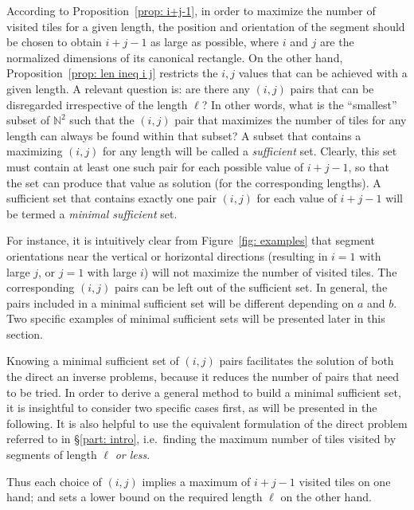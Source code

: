 \documentclass[12pt, a4paper]{article}
\newcommand{\len}{\ell} %
\newcommand{\touched}{visited}
\begin{document}
According to Proposition~\ref{prop: i+j-1}, in order to maximize the number of \touched{} tiles for a given length, the position and orientation of the segment should be chosen to obtain $i+j-1$ as large as possible, where $i$ and $j$ are the normalized dimensions of its canonical rectangle. On the other hand, Proposition~\ref{prop: len ineq i j} restricts the $i, j$ values that can be achieved with a given length. A relevant question is: are there any $(i,j)$ pairs that can be disregarded irrespective of the length $\len$? In other words, what is the ``smallest'' subset of $\mathbb N^2$ such that the $(i,j)$ pair that maximizes the number of tiles for any length can always be found within that subset? A subset that contains a maximizing $(i,j)$ for any length will be called a \emph{sufficient} set. Clearly, this set must contain at least one such pair for each possible value of $i+j-1$, so that the set can produce that value as solution (for the corresponding lengths). A sufficient set that contains exactly one pair $(i,j)$ for each value of $i+j-1$ will be termed a \emph{minimal sufficient} set.

For instance, it is intuitively clear from Figure~\ref{fig: examples} that segment orientations near the vertical or horizontal directions (resulting in $i=1$ with large $j$, or $j=1$ with large $i$) will not maximize the number of \touched{} tiles.
The corresponding $(i,j)$ pairs can be left out of the sufficient set. In general, the pairs included in a minimal sufficient set will be different depending on $a$ and $b$. Two specific examples of minimal sufficient sets will be presented later in this section.

Knowing a minimal sufficient set of $(i,j)$ pairs facilitates the solution of both the direct an inverse problems, because it reduces the number of pairs that need to be tried. In order to derive a general method to build a minimal sufficient set, it is insightful to consider two specific cases first, as will be presented in the following. It is also helpful to use the equivalent formulation of the direct problem referred to in \S\ref{part: intro}, i.e.\ finding the maximum number of tiles \touched{} by segments of length $\len$ \emph{or less}.

Thus each choice of $(i, j)$ implies a maximum of $i+j-1$ \touched{} tiles on one hand; and sets a lower bound on the required length $\len$ on the other hand.
\end{document}
